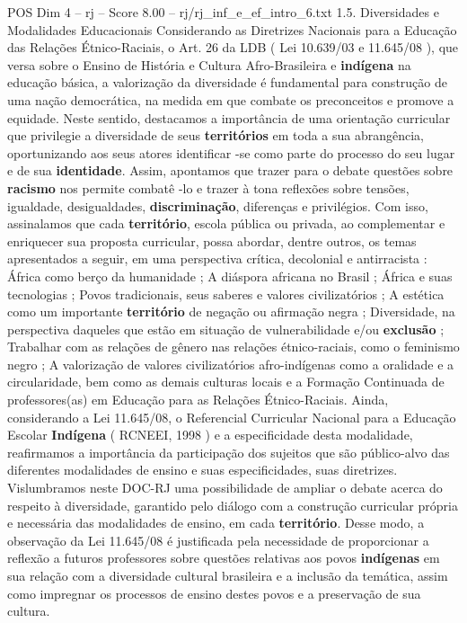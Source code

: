 \begin{textsample}{POS Dim 4 – rj – Score 8.00 – rj/rj\_inf\_e\_ef\_intro\_6.txt}  \label{ex:f4_pos_166}
1.5.
Diversidades e Modalidades Educacionais Considerando as Diretrizes Nacionais para a Educação das Relações Étnico-Raciais, o Art. 26 da LDB ( Lei 10.639/03 e 11.645/08 ), que versa sobre o Ensino de História e Cultura Afro-Brasileira e \textbf{indígena} na educação básica, a valorização da diversidade é fundamental para construção de uma nação democrática, na medida em que combate os preconceitos e promove a equidade.
Neste sentido, destacamos a importância de uma orientação curricular que privilegie a diversidade de seus \textbf{territórios} em toda a sua abrangência, oportunizando aos seus atores identificar -se como parte do processo do seu lugar e de sua \textbf{identidade}.
Assim, apontamos que trazer para o debate questões sobre \textbf{racismo} nos permite combatê -lo e trazer à tona reflexões sobre tensões, igualdade, desigualdades, \textbf{discriminação}, diferenças e privilégios.
Com isso, assinalamos que cada \textbf{território}, escola pública ou privada, ao complementar e enriquecer sua proposta curricular, possa abordar, dentre outros, os temas apresentados a seguir, em uma perspectiva crítica, decolonial e antirracista : África como berço da humanidade ; A diáspora africana no Brasil ; África e suas tecnologias ; Povos tradicionais, seus saberes e valores civilizatórios ; A estética como um importante \textbf{território} de negação ou afirmação negra ; Diversidade, na perspectiva daqueles que estão em situação de vulnerabilidade e/ou \textbf{exclusão} ; Trabalhar com as relações de gênero nas relações étnico-raciais, como o feminismo negro ; A valorização de valores civilizatórios afro-indígenas como a oralidade e a circularidade, bem como as demais culturas locais e a Formação Continuada de professores(as) em Educação para as Relações Étnico-Raciais.
Ainda, considerando a Lei 11.645/08, o Referencial Curricular Nacional para a Educação Escolar \textbf{Indígena} ( RCNEEI, 1998 ) e a especificidade desta modalidade, reafirmamos a importância da participação dos sujeitos que são público-alvo das diferentes modalidades de ensino e suas especificidades, suas diretrizes.
Vislumbramos neste DOC-RJ uma possibilidade de ampliar o debate acerca do respeito à diversidade, garantido pelo diálogo com a construção curricular própria e necessária das modalidades de ensino, em cada \textbf{território}.
Desse modo, a observação da Lei 11.645/08 é justificada pela necessidade de proporcionar a reflexão a futuros professores sobre questões relativas aos povos \textbf{indígenas} em sua relação com a diversidade cultural brasileira e a inclusão da temática, assim como impregnar os processos de ensino destes povos e a preservação de sua cultura.

\end{textsample}
